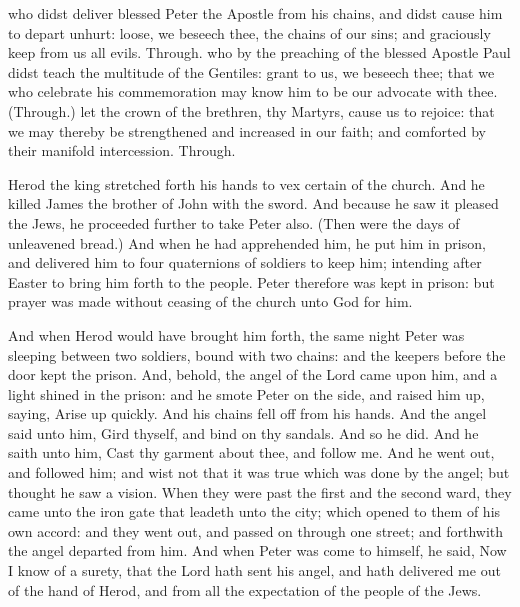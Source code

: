 \collect
{} who didst deliver blessed Peter the Apostle from his chains, and didst cause him to depart unhurt: loose, we beseech thee, the chains of our sins; and graciously keep from us all evils. Through.
 who by the preaching of the blessed Apostle Paul didst teach the multitude of the Gentiles: grant to us, we beseech thee; that we who celebrate his commemoration may know him to be our advocate with thee. (Through.)
 let the crown of the brethren, thy Martyrs, cause us to rejoice: that we may thereby be strengthened and increased in our faith; and comforted by their manifold intercession. Through.

 Herod the king stretched forth his hands to vex certain of the church. And he killed James the brother of John with the sword. And because he saw it pleased the Jews, he proceeded further to take Peter also. (Then were the days of unleavened bread.) And when he had apprehended him, he put him in prison, and delivered him to four quaternions of soldiers to keep him; intending after Easter to bring him forth to the people. Peter therefore was kept in prison: but prayer was made without ceasing of the church unto God for him.

And when Herod would have brought him forth, the same night Peter was sleeping between two soldiers, bound with two chains: and the keepers before the door kept the prison. And, behold, the angel of the Lord came upon him, and a light shined in the prison: and he smote Peter on the side, and raised him up, saying, Arise up quickly. And his chains fell off from his hands. And the angel said unto him, Gird thyself, and bind on thy sandals. And so he did. And he saith unto him, Cast thy garment about thee, and follow me. And he went out, and followed him; and wist not that it was true which was done by the angel; but thought he saw a vision. When they were past the first and the second ward, they came unto the iron gate that leadeth unto the city; which opened to them of his own accord: and they went out, and passed on through one street; and forthwith the angel departed from him. And when Peter was come to himself, he said, Now I know of a surety, that the Lord hath sent his angel, and hath delivered me out of the hand of Herod, and from all the expectation of the people of the Jews.


